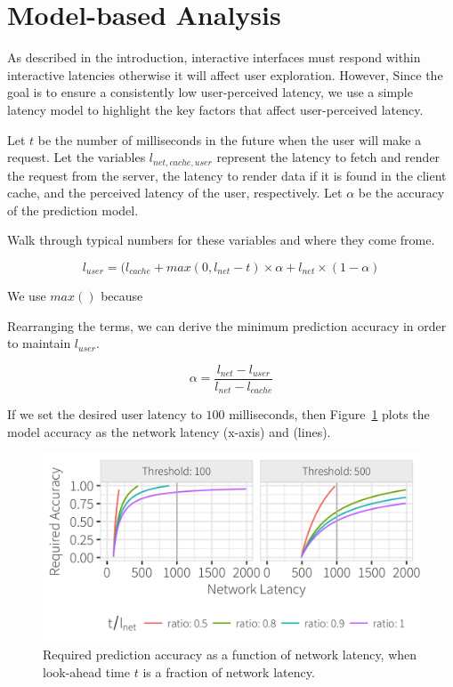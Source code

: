 
\section{Model-based Analysis}

As described in the introduction, interactive interfaces must respond within interactive latencies otherwise it will affect user exploration.
However, 
Since the goal is to ensure a consistently low user-perceived latency, we use a simple latency model to
highlight the key factors that affect user-perceived latency.


Let $t$ be the number of milliseconds in the future when the user will make a request.
Let the variables $l_{net,cache,user}$ represent the latency to fetch and render the request from the server,
the latency to render data if it is found in the client cache, and the perceived latency of the user, respectively.
Let $\alpha$ be the accuracy of the prediction model.

Walk through typical numbers for these variables and where they come frome.

$$l_{user} = (l_{cache} + max(0, l_{net} - t)\times \alpha + l_{net}\times(1-\alpha) $$

We use $max()$ because 

Rearranging the terms, we can derive the minimum prediction accuracy in order to maintain $l_{user}$.

$$\alpha = \frac{l_{net} - l_{user}}{l_{net} - l_{cache}}$$

If we set the desired user latency to $100$ milliseconds, then Figure~\ref{fig:model_base} plots the model accuracy as the network latency (x-axis) and  (lines).

\begin{figure}
	\centering
	\includegraphics[width=1\columnwidth]{figures/model_base}
 	\caption{Required prediction accuracy as a function of network latency, when look-ahead time $t$ is a fraction of network latency.}
    \label{fig:model_base}
\end{figure}

